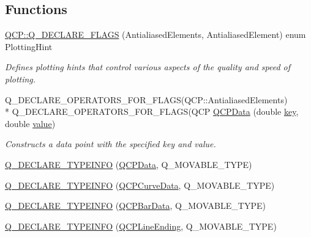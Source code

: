 \subsection*{Functions}
\begin{DoxyCompactItemize}
\item 
\hyperlink{a00143_ad872998745107257e1136d548498d18c}{Q\+C\+P\+::\+Q\+\_\+\+D\+E\+C\+L\+A\+R\+E\+\_\+\+F\+L\+A\+G\+S} (Antialiased\+Elements, Antialiased\+Element) enum Plotting\+Hint
\begin{DoxyCompactList}\small\item\em Defines plotting hints that control various aspects of the quality and speed of plotting. \end{DoxyCompactList}\item 
Q\+\_\+\+D\+E\+C\+L\+A\+R\+E\+\_\+\+O\+P\+E\+R\+A\+T\+O\+R\+S\+\_\+\+F\+O\+R\+\_\+\+F\+L\+A\+G\+S(Q\+C\+P\+::\+Antialiased\+Elements) \\*
Q\+\_\+\+D\+E\+C\+L\+A\+R\+E\+\_\+\+O\+P\+E\+R\+A\+T\+O\+R\+S\+\_\+\+F\+O\+R\+\_\+\+F\+L\+A\+G\+S(Q\+C\+P \hyperlink{a00116_aa274181ae8de2a0907ba5464d3c2c103}{Q\+C\+P\+Data} (double \hyperlink{a00116_a94bb892c30911cd62cba0707a5395be4}{key}, double \hyperlink{a00116_aee90379adb0307effb138f4871edbc5c}{value})
\begin{DoxyCompactList}\small\item\em Constructs a data point with the specified {\itshape key} and {\itshape value}. \end{DoxyCompactList}\item 
\hyperlink{a00116_ae6c02a20d51ce03bc5dfd27c25a1cc6a}{Q\+\_\+\+D\+E\+C\+L\+A\+R\+E\+\_\+\+T\+Y\+P\+E\+I\+N\+F\+O} (\hyperlink{a00030_d2/d94/a00184}{Q\+C\+P\+Data}, Q\+\_\+\+M\+O\+V\+A\+B\+L\+E\+\_\+\+T\+Y\+P\+E)
\item 
\hyperlink{a00116_a274cda11a63dec5b5796c0cf25efd5d7}{Q\+\_\+\+D\+E\+C\+L\+A\+R\+E\+\_\+\+T\+Y\+P\+E\+I\+N\+F\+O} (\hyperlink{a00029}{Q\+C\+P\+Curve\+Data}, Q\+\_\+\+M\+O\+V\+A\+B\+L\+E\+\_\+\+T\+Y\+P\+E)
\item 
\hyperlink{a00116_a620613bd0461892b290f74997828edae}{Q\+\_\+\+D\+E\+C\+L\+A\+R\+E\+\_\+\+T\+Y\+P\+E\+I\+N\+F\+O} (\hyperlink{a00026}{Q\+C\+P\+Bar\+Data}, Q\+\_\+\+M\+O\+V\+A\+B\+L\+E\+\_\+\+T\+Y\+P\+E)
\item 
\hyperlink{a00116_a1376c7245cffa4c7a6b945a542473907}{Q\+\_\+\+D\+E\+C\+L\+A\+R\+E\+\_\+\+T\+Y\+P\+E\+I\+N\+F\+O} (\hyperlink{a00046}{Q\+C\+P\+Line\+Ending}, Q\+\_\+\+M\+O\+V\+A\+B\+L\+E\+\_\+\+T\+Y\+P\+E)
\item 

\end{DoxyCompactItemize}
